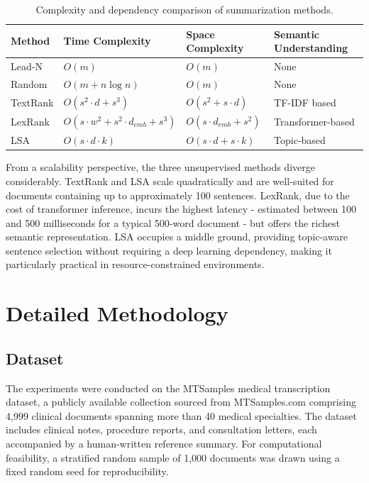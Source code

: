 \documentclass[12pt,twoside,en,win]{bmzhart}
\begin{document}
	\begin{table}[h]
	\centering
	\caption{Complexity and dependency comparison of summarization methods.}
	\label{tab:complexity-comparison}
	\begin{tabular}{@{}llll@{}}
	\toprule
	\textbf{Method} & \textbf{Time Complexity} & \textbf{Space Complexity} & \textbf{Semantic Understanding} \\ \midrule
	Lead-N   & $O(m)$                                     & $O(m)$                    & None              \\
	Random   & $O(m + n \log n)$                          & $O(m)$                    & None              \\
	TextRank & $O(s^2 \cdot d + s^3)$                     & $O(s^2 + s \cdot d)$      & TF-IDF based      \\
	LexRank  & $O(s \cdot w^2 + s^2 \cdot d_{emb} + s^3)$ & $O(s \cdot d_{emb} + s^2)$ & Transformer-based \\
	LSA      & $O(s \cdot d \cdot k)$                     & $O(s \cdot d + s \cdot k)$ & Topic-based       \\ \bottomrule
	\end{tabular}
	\end{table}

	From a scalability perspective, the three unsupervised methods diverge considerably. TextRank and LSA scale 
	quadratically and are well-suited for documents containing up to approximately 100 sentences. LexRank, due to 
	the cost of transformer inference, incurs the highest latency - estimated between 100 and 500 milliseconds for 
	a typical 500-word document - but offers the richest semantic representation. LSA occupies a middle ground, 
	providing topic-aware sentence selection without requiring a deep learning dependency, making it particularly 
	practical in resource-constrained environments.




	\section{Detailed Methodology}

	\subsection{Dataset}

	The experiments were conducted on the MTSamples medical transcription dataset, a publicly available collection 
	sourced from MTSamples.com comprising 4,999 clinical documents spanning more than 40 medical specialties. The 
	dataset includes clinical notes, procedure reports, and consultation letters, each accompanied by a human-written 
	reference summary. For computational feasibility, a stratified random sample of 1,000 documents was drawn using 
	a fixed random seed for reproducibility.
\end{document}

